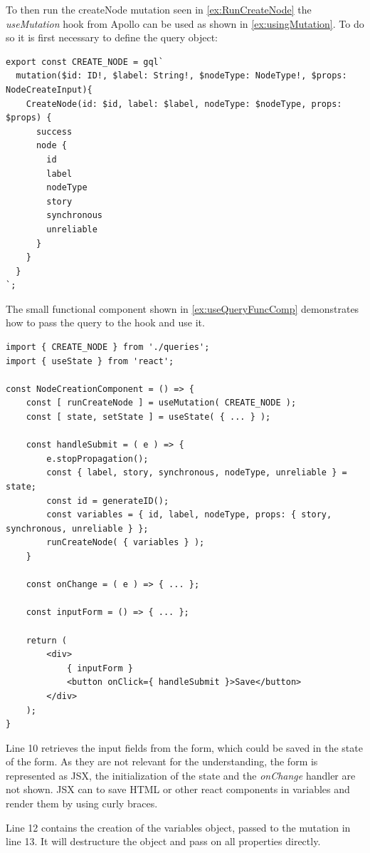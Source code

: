 To then run the createNode mutation seen in \autoref{ex:RunCreateNode} the \emph{useMutation} hook from Apollo can be used as shown in \autoref{ex:usingMutation}. To do so it is first necessary to define the query object:

\begin{lstlisting}[label={ex:DefQuery},caption={Mutation to Create a Node in the Database}]
export const CREATE_NODE = gql`
  mutation($id: ID!, $label: String!, $nodeType: NodeType!, $props: NodeCreateInput){
    CreateNode(id: $id, label: $label, nodeType: $nodeType, props: $props) {
      success
      node {
        id
        label
        nodeType
        story
        synchronous
        unreliable
      }
    }
  }
`;
\end{lstlisting}
\noindent
The small functional component shown in \autoref{ex:useQueryFuncComp} demonstrates how to pass the query to the hook and use it.
\lstset{language=JavaScript}
\begin{lstlisting}[caption={Using the Query in a Component (no actual application code)},label={ex:useQueryFuncComp}]
import { CREATE_NODE } from './queries';
import { useState } from 'react';

const NodeCreationComponent = () => {
	const [ runCreateNode ] = useMutation( CREATE_NODE );
	const [ state, setState ] = useState( { ... } );
	
	const handleSubmit = ( e ) => {
		e.stopPropagation();
		const { label, story, synchronous, nodeType, unreliable } = state; 
		const id = generateID();
		const variables = { id, label, nodeType, props: { story, synchronous, unreliable } }; 
		runCreateNode( { variables } );
	}

	const onChange = ( e ) => { ... };
	
	const inputForm = () => { ... };
	
	return (
		<div>
			{ inputForm }
			<button onClick={ handleSubmit }>Save</button>
		</div>	
	);
}
\end{lstlisting}
Line 10 retrieves the input fields from the form, which could be saved in the state of the form. As they are not relevant for the understanding, the form is represented as JSX, the initialization of the state and the \emph{onChange} handler are not shown. JSX can to save HTML or other react components in variables and render them by using curly braces.

Line 12 contains the creation of the variables object, passed to the mutation in line 13. It will destructure the object and pass on all properties directly.

